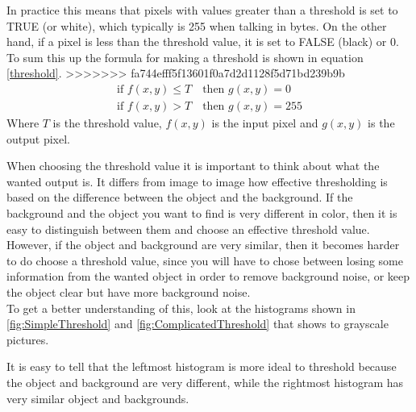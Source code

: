 In practice this means that pixels with values greater than a threshold is set to TRUE (or white), which typically is 255 when talking in bytes. On the other hand, if a pixel is less than the threshold value, it is set to FALSE (black) or 0. To sum this up the formula for making a threshold is shown in equation \ref{threshold}.
>>>>>>> fa744efff5f13601f0a7d2d1128f5d71bd239b9b
\begin{equation}
  \begin{aligned}
  	\text{if } f(x,y)\leq T \quad \text{then } g(x,y)=0 \\
  	\text{if } f(x,y)>T \quad \text{then } g(x,y)=255
	\label{threshold}  
  \end{aligned} 
\end{equation}
Where $T$ is the threshold value, $f(x,y)$ is the input pixel and $g(x,y)$ is the output pixel. 

When choosing the threshold value it is important to think about what the wanted output is. It differs  from image to image how effective thresholding is based on the difference between the object and the background. If the background and the object you want to find is very different in color, then it is easy to distinguish between them and choose an effective threshold value. However, if the object and background are very similar, then it becomes harder to do choose a threshold value, since you will have to chose between losing some information from the wanted object in order to remove background noise, or keep the object clear but have more background noise. \\
To get a better understanding of this, look at the histograms shown in \eqref{fig:SimpleThreshold} and \eqref{fig:ComplicatedThreshold} that shows to grayscale pictures.

It is easy to tell that the leftmost histogram is more ideal to threshold because the object and background are very different, while the rightmost histogram has very similar object and backgrounds.

